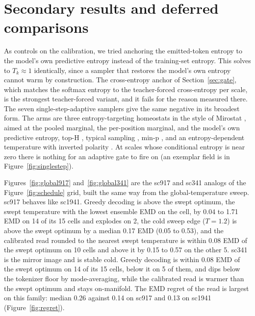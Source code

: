 \documentclass{article}
\begin{document}
\section{Secondary results and deferred comparisons}
\label{app:secondary}

As controls on the calibration, we tried anchoring the emitted-token entropy to the
model's own predictive entropy instead of the training-set entropy. This solves to
$T_k \approx 1$ identically, since a sampler that restores the model's own entropy cannot
warm by construction. The cross-entropy anchor of Section~\ref{sec:gate}, which matches
the softmax entropy to the teacher-forced cross-entropy per scale, is the strongest
teacher-forced variant, and it fails for the reason measured there. The
seven single-step-adaptive samplers give the same negative in its broadest form. The arms
are three entropy-targeting homeostats in the style of Mirostat \citep{basu2021mirostat},
aimed at the pooled marginal, the per-position marginal, and the model's own predictive
entropy, top-H \citep{baghaeipotraghloo2025toph}, typical sampling
\citep{meister2023typical}, min-p \citep{nguyen2025minp}, and an entropy-dependent
temperature with inverted polarity \citep{zhang2024edt}. At scales whose conditional
entropy is near zero there is nothing for an adaptive gate to fire on
(an exemplar field is in Figure~\ref{fig:singlestep}).

Figures~\ref{fig:global917} and~\ref{fig:global341} are the sc917 and sc341 analogs of
the Figure~\ref{fig:schedule} grid, built the same way from the global-temperature sweep.
sc917 behaves like sc1941. Greedy decoding is above the swept optimum, the swept
temperature with the lowest ensemble EMD on the cell, by 0.04 to 1.71 EMD on 14 of its 15
cells and explodes on 2, the cold sweep edge ($T{=}1.2$) is above the swept optimum by a
median 0.17 EMD (0.05 to 0.53), and the calibrated read rounded to the nearest swept
temperature is within 0.08 EMD of the swept optimum on 10 cells and above it by 0.15 to
0.57 on the other 5. sc341 is the mirror image
and is stable cold. Greedy decoding is within 0.08 EMD of the swept optimum on 14 of its
15 cells, below it on 5 of them, and dips below the tokenizer floor by mode-averaging,
while the calibrated read is warmer than the swept optimum
and stays on-manifold. The EMD regret of the read is largest on this family: median 0.26
against 0.14 on sc917 and 0.13 on sc1941 (Figure~\ref{fig:regret}).
\end{document}
